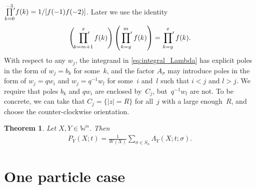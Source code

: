 \documentclass[11pt]{article}
\numberwithin{equation}{section}
\newtheorem{Theorem}{Theorem}[section]
\newcommand{\prodprime}{\sideset{}{'}\prod}
\newcommand{\Weylchamber}{\mathbb{W}}
\begin{document}
 $\prod\limits^{-3}_{k = 0}\!\!{\vphantom{\prod}}' f(k) = 1/[f(-1) f(-2)]$. Later we use the identity
\begin{gather*}
 \left( \prodprime^x_{k = m + 1} f(k) \right) \left( \prodprime^m_{k = y} f(k) \right) = \prodprime^x_{k = y} f(k).
\end{gather*}
With respect to any $w_j$, the integrand in \eqref{eq:integral_Lambda} has explicit poles in the form of $w_j = b_k$ for some~$k$, and the factor $A_{\sigma}$ may introduce poles in the form of $w_j = q w_i$ and $w_j = q^{-1} w_l$ for some~$i$ and~$l$ such that $i < j$ and $l > j$. We require that poles $b_k$ and $q w_i$ are enclosed by~$C_j$, but~$q^{-1} w_l$ are not. To be concrete, we can take that $C_j = \{ \lvert z \rvert = R \}$ for all~$j$ with a large enough~$R$, and choose the counter-clockwise orientation.
\begin{Theorem} \label{thm:main}
 Let $X, Y \in \Weylchamber^n$. Then
 \begin{gather} \label{eq:main_result}
 P_Y(X; t) = \frac{1}{W(X)} \sum_{\sigma \in S_n} \Lambda_Y(X; t; \sigma).
 \end{gather}
\end{Theorem}
\setcounter{section}{1}
\setcounter{subsection}{2}
\setcounter{subsubsection}{0}
\setcounter{Theorem}{3}
\setcounter{equation}{8}
\section{One particle case} \label{sec:1pt}
\end{document}
